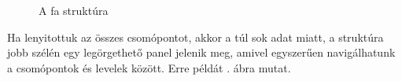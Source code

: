 \begin{figure} [H]
	\centering
	\caption{A fa struktúra}
	\label{fig:tree}
\end{figure}

Ha lenyitottuk az összes csomópontot, akkor a túl sok adat miatt, a struktúra jobb szélén egy legörgethető panel jelenik meg, amivel egyszerűen navigálhatunk a csomópontok és levelek között. Erre példát . ábra mutat.

